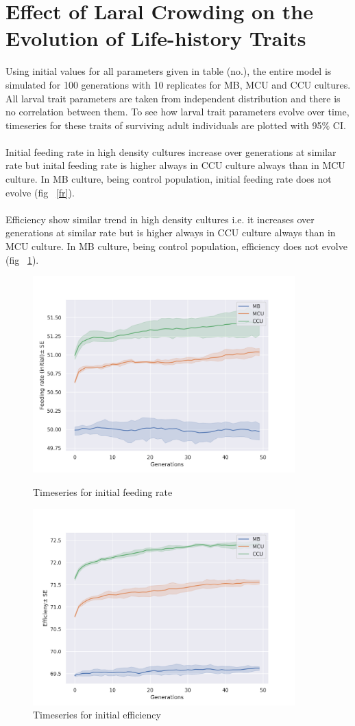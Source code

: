 \section{Effect of Laral Crowding on the Evolution of Life-history Traits}
Using initial values for all parameters given in table (no.), the entire model is simulated for 100 generations with 10 replicates for MB, MCU and CCU cultures. All larval trait parameters are taken from independent distribution and there is no correlation between them. To see how larval trait parameters evolve over time, timeseries for these traits of surviving adult individuals are plotted with 95$\%$ CI. \\\\
Initial feeding rate in high density cultures increase over generations at similar rate but inital feeding rate is higher always in CCU culture always than in MCU culture. In MB culture, being control population, initial feeding rate does not evolve (fig ~\ref{fr}).\\\\
Efficiency show similar trend in high density cultures i.e. it increases over generations at similar rate but is higher always in CCU culture always than in MCU culture. In MB culture, being control population, efficiency does not evolve (fig ~\ref{eff}).
\newpage
\begin{figure}
  \centering
  \includegraphics[width=0.9\textwidth]{C4/Figs/fr}
  \caption{Timeseries for initial feeding rate}
  \label{fr}
  \includegraphics[width=0.9\textwidth]{C4/Figs/eff}
  \caption{Timeseries for initial efficiency}
  \label{eff}
\end{figure}
